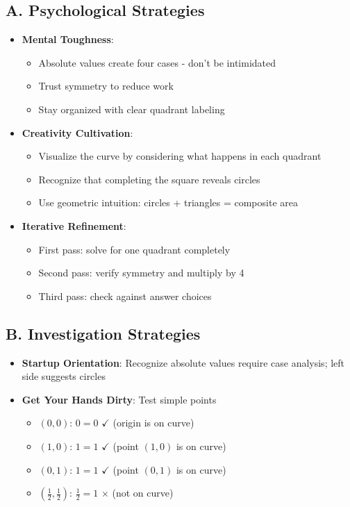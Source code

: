 \documentclass[]{article}
\begin{document}
\begin{strategicbox}
\subsection*{A. Psychological Strategies}
\begin{itemize}[leftmargin=*]
    \item \textbf{Mental Toughness}: 
    \begin{itemize}
        \item Absolute values create four cases - don't be intimidated
        \item Trust symmetry to reduce work
        \item Stay organized with clear quadrant labeling
    \end{itemize}
    
    \item \textbf{Creativity Cultivation}: 
    \begin{itemize}
        \item Visualize the curve by considering what happens in each quadrant
        \item Recognize that completing the square reveals circles
        \item Use geometric intuition: circles + triangles = composite area
    \end{itemize}
    
    \item \textbf{Iterative Refinement}: 
    \begin{itemize}
        \item First pass: solve for one quadrant completely
        \item Second pass: verify symmetry and multiply by 4
        \item Third pass: check against answer choices
    \end{itemize}
\end{itemize}

\subsection*{B. Investigation Strategies}
\begin{itemize}[leftmargin=*]
    \item \textbf{Startup Orientation}: Recognize absolute values require case analysis; left side suggests circles
    
    \item \textbf{Get Your Hands Dirty}: Test simple points
    \begin{itemize}
        \item $(0,0)$: $0 = 0$ $\checkmark$ (origin is on curve)
        \item $(1,0)$: $1 = 1$ $\checkmark$ (point $(1,0)$ is on curve)
        \item $(0,1)$: $1 = 1$ $\checkmark$ (point $(0,1)$ is on curve)
        \item $(\frac{1}{2}, \frac{1}{2})$: $\frac{1}{2} = 1$ $\times$ (not on curve)
    \end{itemize}
    

\end{itemize}
\end{strategicbox}
\end{document}
